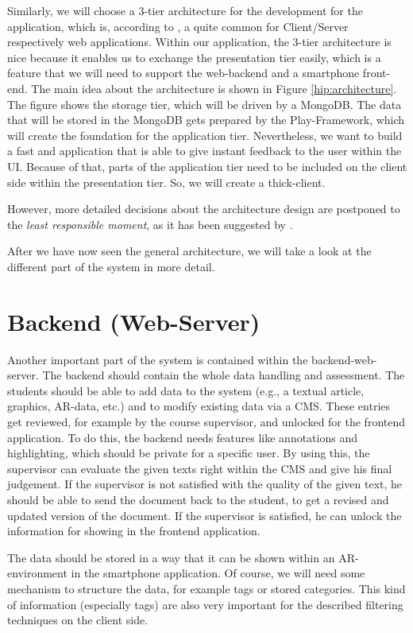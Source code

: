 Similarly, we will choose a 3-tier architecture for the development for the application, which is, according to \cite{Eckerson1995}, a quite common for Client/Server respectively web applications. Within our application, the 3-tier architecture is nice because it enables us to exchange the presentation tier easily, which is a feature that we will need to support the web-backend and a smartphone front-end. The main idea about the architecture is shown in Figure \ref{hip:architecture}. The figure shows the storage tier, which will be driven by a MongoDB. The data that will be stored in the MongoDB gets prepared by the Play-Framework, which will create the foundation for the application tier. Nevertheless, we want to build a fast and application that is able to give instant feedback to the user within the \ac{UI}. Because of that, parts of the application tier need to be included on the client side within the presentation tier. So, we will create a thick-client. 

However, more detailed decisions about the architecture design are postponed to the \textit{least responsible moment}, as it has been suggested by \cite{Mast2013}.

After we have now seen the general architecture, we will take a look at the different part of the system in more detail.
 
\section{Backend (Web-Server)}
Another important part of the system is contained within the backend-web-server. The backend should contain the whole data handling and assessment. The students should be able to add data to the system (e.g., a textual article, graphics, \ac{AR}-data, etc.) and to modify existing data via a \ac{CMS}. These entries get reviewed, for example by the course supervisor, and unlocked for the frontend application. To do this, the backend needs features like annotations and highlighting, which should be private for a specific user. By using this, the supervisor can evaluate the given texts right within the \ac{CMS} and give his final judgement. If the supervisor is not satisfied with the quality of the given text, he should be able to send the document back to the student, to get a revised and updated version of the document. If the supervisor is satisfied, he can unlock the information for showing in the frontend application.

The data should be stored in a way that it can be shown within an \ac{AR}-environment in the smartphone application. Of course, we will need some mechanism to structure the data, for example tags or stored categories. This kind of information (especially tags) are also very important for the described filtering techniques on the client side.

